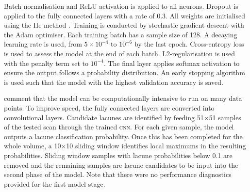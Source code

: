 Batch normalisation and ReLU activation is applied to all neurons. Dropout is applied to the fully connected layers with a rate of 0.3. All weights are initialised using the He method \citep{HeKaiming2015DDiR}. Training is conducted by stochastic gradient descent with the Adam optimiser. Each training batch has a sample size of 128. A decaying learning rate is used, from $5\times10^{-4}$ to $10^{-6}$ by the last epoch. Cross-entropy loss is used to assess the model at the end of each batch. L2-regularisation is used with the penalty term set to $10^{-4}$. The final layer applies softmax activation to ensure the output follows a probability distribution. An early stopping algorithm is used such that the model with the highest validation accuracy is saved.

\cite{GhafoorianM.2017Dml3} comment that the model can be computationally intensive to run on many data points. To improve speed, the fully connected layers are converted into convolutional layers. Candidate lacunes are identified by feeding 51$\times$51 samples of the tested scan through the trained \textsc{cnn}. For each given sample, the model outputs a lacune classification probability. Once this has been completed for the whole volume, a 10$\times$10 sliding window identifies local maximums in the resulting probabilities. Sliding window samples with lacune probabilities below 0.1 are removed and the remaining samples are lacune candidates to be input into the second phase of the model. Note that there were no performance diagnostics provided for the first model stage.

